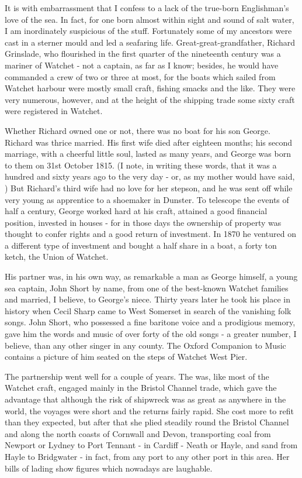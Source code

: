 It is with embarrassment that I confess to a lack of the true-born Englishman's love of the sea. In fact, for one born almost within sight and sound of salt water, I am inordinately suspicious of the stuff. Fortunately some of my ancestors were cast in a sterner mould and led a seafaring life. Great-great-grandfather, Richard Grinslade, who flourished in the first quarter of the nineteenth century was a mariner of Watchet - not a captain, as far as I know; besides, he would have commanded a crew of two or three at most, for the boats which sailed from Watchet harbour were mostly small craft, fishing smacks and the like. They were very numerous, however, and at the height of the shipping trade some sixty craft were registered in Watchet.

Whether Richard owned one or not, there was no boat for his son George. Richard was thrice married. His first wife died after eighteen months; his second marriage, with a cheerful little soul, lasted as many years, and George was born to them on 31st October 1815. (I note, in writing these words, that it was a hundred and sixty years ago to the very day - or, as my mother would have said, ) But Richard's third wife had no love for her stepson, and he was sent off while very young as apprentice to a shoemaker in Dunster.
To telescope the events of half a century, George worked hard at his craft, attained a good financial position, invested in houses - for in those days the ownership of property was thought to confer rights and a good return of investment. In 1870 he ventured on a different type of investment and bought a half share in a boat, a forty ton ketch, the Union of Watchet.

His partner was, in his own way, as remarkable a man as George himself, a young sea captain, John Short by name, from one of the best-known Watchet families and married, I believe, to George's niece. Thirty years later he took his place in history when Cecil Sharp came to West Somerset in search of the vanishing folk songs. John Short, who possessed a fine baritone voice and a prodigious memory, gave him the words and music of over forty of the old songs - a greater number, I believe, than any other singer in any county. The Oxford Companion to Music contains a picture of him seated on the steps of Watchet West Pier.

The partnership went well for a couple of years. The  was, like most of the Watchet craft, engaged mainly in the Bristol Channel trade, which gave the advantage that although the risk of shipwreck was as great as anywhere in the world, the voyages were short and the returns fairly rapid. She cost more to refit than they expected, but after that she plied steadily round the Bristol Channel and along the north coasts of Cornwall and Devon, transporting coal from Newport or Lydney to Port Tennant - in Cardiff - Neath or Hayle, and sand from Hayle to Bridgwater - in fact, from any port to any other port in this area. Her bills of lading show figures which nowadays are laughable.

